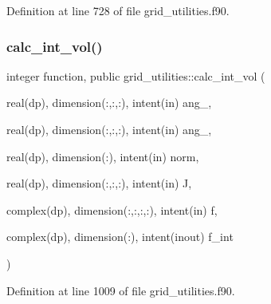 Definition at line 728 of file grid\+\_\+utilities.\+f90.

\mbox{\label{namespacegrid__utilities_a97e3106dbdc10b726af74afa113ba533}} 
\subsubsection{\texorpdfstring{calc\+\_\+int\+\_\+vol()}{calc\_int\_vol()}}
{\footnotesize\ttfamily integer function, public grid\+\_\+utilities\+::calc\+\_\+int\+\_\+vol (\begin{DoxyParamCaption}\item[{real(dp), dimension(\+:,\+:,\+:), intent(in)}]{ang\+\_,  }\item[{real(dp), dimension(\+:,\+:,\+:), intent(in)}]{ang\+\_,  }\item[{real(dp), dimension(\+:), intent(in)}]{norm,  }\item[{real(dp), dimension(\+:,\+:,\+:), intent(in)}]{J,  }\item[{complex(dp), dimension(\+:,\+:,\+:,\+:), intent(in)}]{f,  }\item[{complex(dp), dimension(\+:), intent(inout)}]{f\+\_\+int }\end{DoxyParamCaption})}



Definition at line 1009 of file grid\+\_\+utilities.\+f90.

